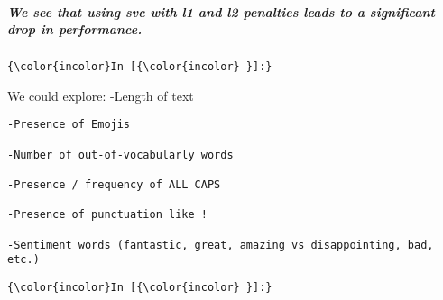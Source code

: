 \documentclass[11pt]{article}
\begin{document}
    \subparagraph{We see that using svc with l1 and l2 penalties leads to a
significant drop in
performance.}\label{we-see-that-using-svc-with-l1-and-l2-penalties-leads-to-a-significant-drop-in-performance.}

    \begin{Verbatim}[commandchars=\\\{\}]
{\color{incolor}In [{\color{incolor} }]:} 
\end{Verbatim}

    We could explore: -Length of text

\begin{verbatim}
-Presence of Emojis

-Number of out-of-vocabularly words

-Presence / frequency of ALL CAPS

-Presence of punctuation like !

-Sentiment words (fantastic, great, amazing vs disappointing, bad, etc.)
\end{verbatim}

    \begin{Verbatim}[commandchars=\\\{\}]
{\color{incolor}In [{\color{incolor} }]:} 
\end{Verbatim}


    
    
    
    
\end{document}

